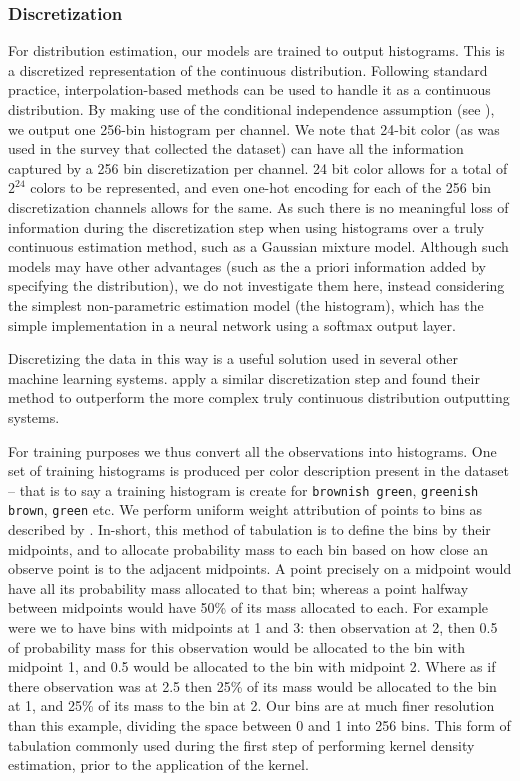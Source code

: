 \documentclass[]{clv3}
\newcommand{\textcite}{\citet}
\newcommand{\natlang}[1]{\texttt{#1}}
\begin{document}
\subsubsection{Discretization} \label{sec:discretization}
For distribution estimation, our models are trained to output histograms.
This is a discretized representation of the continuous distribution.
Following standard practice, interpolation-based methods can be used to handle it as a continuous distribution.
By making use of the conditional independence assumption (see ), we output one 256-bin histogram per channel.
We note that 24-bit color (as was used in the survey that collected the dataset) can have all the information captured by a 256 bin discretization  per channel.
24 bit color allows for a total of $2^{24}$ colors to be represented, and even one-hot encoding for each of the 256 bin discretization channels allows for the same.
As such there is no meaningful loss of information during the discretization step when using histograms over a truly continuous estimation method, such as a Gaussian mixture model.
Although such models may have other advantages (such as the a priori information added by specifying the distribution), we do not investigate them here, instead considering the simplest non-parametric estimation model (the histogram), which has the simple implementation in a neural network using a softmax output layer.

Discretizing the data in this way is a useful solution used in several other machine learning systems.
\textcite{oord2016pixel, DBLP:journals/corr/OordDZSVGKSK16} apply a similar discretization step and found their method to outperform the more complex truly continuous distribution outputting systems.

For training purposes we thus convert all the observations into histograms.
One set of training histograms is produced per color description present in the dataset -- that is to say a training histogram is create for \natlang{brownish green}, \natlang{greenish brown}, \natlang{green} etc.
We perform uniform weight attribution of points to bins as described by \textcite{jones1984remark}.
In-short, this method of tabulation is to define the bins by their midpoints, and to allocate probability mass to each bin based on how close an observe point is to the adjacent midpoints.
A point precisely on a midpoint would have all its probability mass allocated to that bin;
whereas a point halfway between midpoints would have 50\% of its mass allocated to each.
For example were we to have bins with midpoints at 1 and 3:
then observation at 2, then 0.5 of probability mass for this observation would be allocated to the bin with midpoint 1, and 0.5 would be allocated to the bin with midpoint 2.
Where as if there observation was at 2.5 then 25\% of its mass would be allocated to the bin at 1, and 25\% of its mass to the bin at 2.
Our bins are at much finer resolution than this example, dividing the space between 0 and 1 into 256 bins.
This form of tabulation commonly used during the first step of performing kernel density estimation, prior to the application of the kernel.
\end{document}
